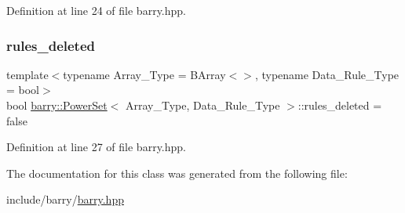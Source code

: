 Definition at line 24 of file barry.\+hpp.

\mbox{\label{classbarry_1_1_power_set_aac868bcdb4a7f6c17d35aa29cf8e5028}} 
\subsubsection{\texorpdfstring{rules\+\_\+deleted}{rules\_deleted}}
{\footnotesize\ttfamily template$<$typename Array\+\_\+\+Type  = B\+Array$<$$>$, typename Data\+\_\+\+Rule\+\_\+\+Type  = bool$>$ \\
bool \hyperlink{classbarry_1_1_power_set}{barry\+::\+Power\+Set}$<$ Array\+\_\+\+Type, Data\+\_\+\+Rule\+\_\+\+Type $>$\+::rules\+\_\+deleted = false}



Definition at line 27 of file barry.\+hpp.



The documentation for this class was generated from the following file\+:\begin{DoxyCompactItemize}
\item 
include/barry/\hyperlink{barry_8hpp}{barry.\+hpp}\end{DoxyCompactItemize}

